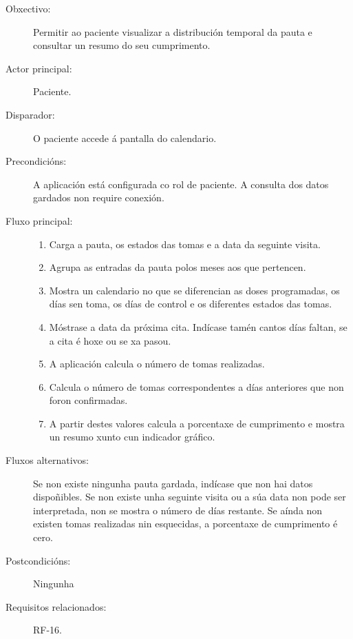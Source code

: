 \begin{description}

\item[Obxectivo:] Permitir ao paciente visualizar a distribución temporal da
pauta e consultar un resumo do seu cumprimento.

\item[Actor principal:] Paciente.

\item[Disparador:] O paciente accede á pantalla do calendario.

\item[Precondicións:] A aplicación está configurada co rol de paciente. A
consulta dos datos gardados non require conexión.

\item[Fluxo principal:] \hfill
\begin{enumerate}

    \item Carga a pauta, os estados das tomas e a data da seguinte visita.

    \item Agrupa as entradas da pauta polos meses aos que pertencen.

    \item Mostra un calendario no que se diferencian as doses programadas, os
    días sen toma, os días de control e os diferentes estados das tomas.

    \item Móstrase a data da próxima cita. Indícase tamén cantos días faltan,
    se a cita é hoxe ou se xa pasou.

    \item A aplicación calcula o número de tomas realizadas.

    \item Calcula o número de tomas correspondentes a días anteriores que non
    foron confirmadas.

    \item A partir destes valores calcula a porcentaxe de cumprimento e mostra
    un resumo xunto cun indicador gráfico.
\end{enumerate}

\item[Fluxos alternativos:] Se non existe ningunha pauta gardada, indícase que
non hai datos dispoñibles. Se non existe unha seguinte visita ou a súa data non
pode ser interpretada, non se mostra o número de días restante. Se aínda non
existen tomas realizadas nin esquecidas, a porcentaxe de cumprimento é cero.

\item[Postcondicións:] Ningunha

\item[Requisitos relacionados:] RF-16.

\end{description}



